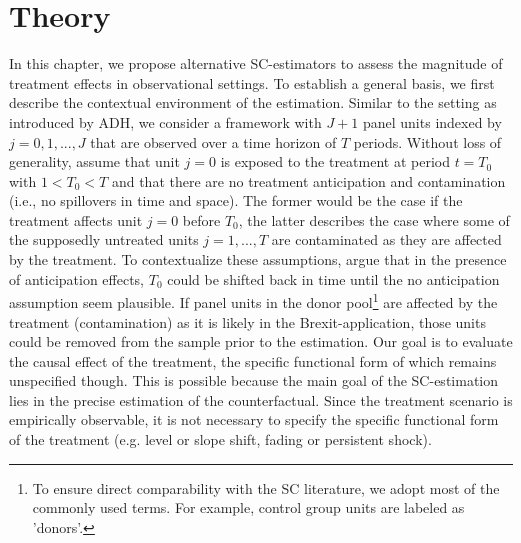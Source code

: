 \section{Theory}
\begin{comment}
\textcolor{magenta}{\textbf{What must be clear by now
	 \begin{itemize}
	 	\item Consider case without covariates
	 	\item Make clear that SC is a weighted average of the donors
	 \end{itemize}}}
\end{comment}
In this chapter, we propose alternative \ac{SC}-estimators to assess the magnitude of treatment effects in observational settings. To establish a general basis, we first describe the contextual environment of the estimation. Similar to the setting as introduced by \ac{ADH}, we consider a framework with $J+1$ panel units indexed by $j = 0,1, ..., J$ that are observed over a time horizon of $T$ periods. Without loss of generality, assume that unit $j = 0$ is exposed to the treatment at period $t = T_0$ with $1 < T_0 < T$ and that there are no treatment anticipation and contamination (i.e., no spillovers in time and space). The former would be the case if the treatment affects unit $j = 0$ before $T_0$, the latter describes the case where some of the supposedly untreated units $j = 1,...,T$ are contaminated as they are affected by the treatment. To contextualize these assumptions, \cite{abadie:2010} argue that in the presence of anticipation effects, $T_0$ could be shifted back in time until the no anticipation assumption seem plausible. If panel units in the donor pool\footnote{To ensure direct comparability with the \ac{SC} literature, we adopt most of the commonly used terms. For example, control group units are labeled as 'donors'.} are affected by the treatment (contamination) as it is likely in the Brexit-application, those units could be removed from the sample prior to the estimation. Our goal is to evaluate the causal effect of the treatment, the specific functional form of which remains unspecified though. This is possible because the main goal of the \ac{SC}-estimation lies in the precise estimation of the counterfactual. Since the treatment  scenario is empirically observable, it is not necessary to specify the specific functional form of the treatment (e.g. level or slope shift, fading or persistent shock).

